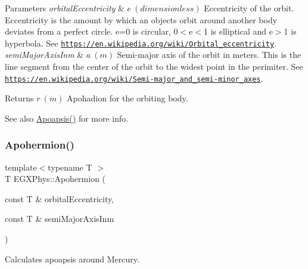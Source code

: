 \begin{DoxyParams}{Parameters}
{\em orbital\+Eccentricity} & $ e\ (dimensionless)$ Eccentricity of the orbit. Eccentricity is the amount by which an objects orbit around another body deviates from a perfect circle. e=0 is circular, 0$<$e$<$1 is elliptical and e$>$1 is hyperbola. See \href{https://en.wikipedia.org/wiki/Orbital_eccentricity}{\tt https\+://en.\+wikipedia.\+org/wiki/\+Orbital\+\_\+eccentricity}. \\
\hline
{\em semi\+Major\+Axis\+Inm} & $ a\ (m)$ Semi-\/major axis of the orbit in meters. This is the line segment from the center of the orbit to the widest point in the perimiter. See \href{https://en.wikipedia.org/wiki/Semi-major_and_semi-minor_axes}{\tt https\+://en.\+wikipedia.\+org/wiki/\+Semi-\/major\+\_\+and\+\_\+semi-\/minor\+\_\+axes}. \\
\hline
\end{DoxyParams}
\begin{DoxyReturn}{Returns}
$ r\ (m)$ Apohadion for the orbiting body. 
\end{DoxyReturn}
\begin{DoxySeeAlso}{See also}
\mbox{\hyperlink{group___e_g_x_phys-_apoapsis_gafd08a2d1d64886e7bb9bcb7ff65bc3ea}{Apoapsis()}} for more info. 
\end{DoxySeeAlso}
\mbox{\label{group___e_g_x_phys-_apoapsis_ga50a476b4a3c9be6ded8308a247bf001c}} 
\subsubsection{\texorpdfstring{Apohermion()}{Apohermion()}}
{\footnotesize\ttfamily template$<$typename T $>$ \\
T E\+G\+X\+Phys\+::\+Apohermion (\begin{DoxyParamCaption}\item[{const T \&}]{orbital\+Eccentricity,  }\item[{const T \&}]{semi\+Major\+Axis\+Inm }\end{DoxyParamCaption})}



Calculates apoapsis around Mercury. 


